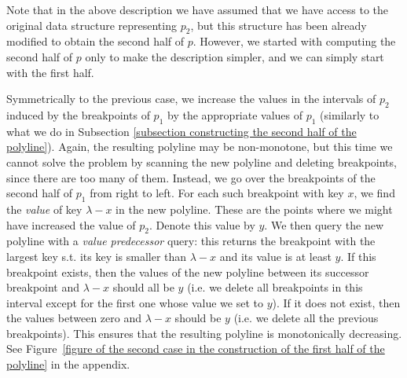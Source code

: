 \documentclass[a4paper,UKenglish]{lipics-v2016}
\theoremstyle{plain}
\begin{document}
Note that in the above description we have assumed that we have access to the original data structure representing $p_{2}$, but this structure has been already modified to obtain the second half of $p$. However, we started with computing the second half of $p$ only to make the description simpler, and we can simply start with the first half.


\medskip {}
Symmetrically to the previous case, we increase the values in the intervals of $p_2$ induced by the breakpoints of $p_1$ by the appropriate values of $p_{1}$ (similarly to what we do in Subsection \ref{subsection constructing the second half of the polyline}). Again, the resulting polyline may be non-monotone, but this time we cannot solve the problem by scanning the new polyline and deleting breakpoints, since there are too many of them. Instead, we go over the breakpoints of the second half of $p_1$ from right to left. For each such breakpoint  with key $x$, we find the {\em value} of key $\lambda - x$ in the new polyline. These are the points where we might have increased the value of $p_2$. Denote this value by $y$. We then query the new polyline with a \emph{value predecessor} query: this returns the breakpoint   with the largest key s.t. its key is smaller than $\lambda - x$ and its value is at least $y$. 
%
If this breakpoint exists, then the values of the new polyline between its successor breakpoint and $\lambda - x$ should all be $y$ (i.e. we delete all breakpoints in this interval except for the first one whose value we set to $y$). %
If it does not exist, then the values between zero and $\lambda - x$ should be $y$ (i.e. we delete all the previous breakpoints). 
This ensures that the resulting polyline is monotonically decreasing. 
See  Figure~\ref{figure of the second case in the construction of the first half of the polyline} in the appendix.
\end{document}
